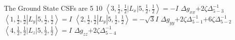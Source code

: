 \documentclass[11pt]{article}
\begin{document}
The Ground State CSFs are 5 10 \newline\newline\newline
$\left\langle3,\frac{1}{2},\frac{1}{2}\left|L_{x}\right|5,\frac{1}{2},\frac{1}{2}\right\rangle=-I$\newline
\newline$\Delta g_{xx}$\newline\newline$+2\zeta \Delta_{5-3}^{-1}$\newline\newline
$\left\langle1,\frac{1}{2},\frac{1}{2}\left|L_{y}\right|5,\frac{1}{2},\frac{1}{2}\right\rangle=I$\newline
$\left\langle2,\frac{1}{2},\frac{1}{2}\left|L_{y}\right|5,\frac{1}{2},\frac{1}{2}\right\rangle=-\sqrt{3}I$\newline
\newline$\Delta g_{yy}$\newline\newline$+2\zeta \Delta_{5-1}^{-1}$\newline$+6\zeta \Delta_{5-2}^{-1}$\newline\newline
$\left\langle4,\frac{1}{2},\frac{1}{2}\left|L_{z}\right|5,\frac{1}{2},\frac{1}{2}\right\rangle=I$\newline
\newline$\Delta g_{zz}$\newline\newline$+2\zeta \Delta_{5-4}^{-1}$\newline\newline
\end{document}
